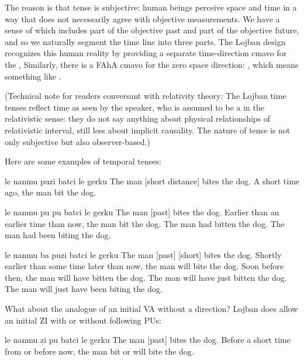The reason is that tense is subjective: human beings
    perceive space and time in a way that does not necessarily
    agree with objective measurements. We have a sense of 
    which includes part of the objective past and part of the
    objective future, and so we naturally segment the time line
    into three parts. The Lojban design recognizes this human
    reality by providing a separate time-direction cmavo for the
    , Similarly, there is a FAhA cmavo for the
    zero space direction: , which means something like
    .

(Technical note for readers conversant with relativity
    theory: The Lojban time tenses reflect time as seen by the
    speaker, who is assumed to be a  in the
    relativistic sense: they do not say anything about physical
    relationships of relativistic interval, still less about
    implicit causality. The nature of tense is not only subjective
    but also observer-based.)

Here are some examples of temporal tenses:
\begin{example}
le nanmu puzi batci le gerku\n
The man  [short distance] bites the dog.\n
A short time ago, the man bit the dog.
\end{example}

\begin{example}
le nanmu pu pu batci le gerku\n
The man  [past] bites the dog.\n
Earlier than an earlier time than now,\n
\T	the man bit the dog.\n
The man had bitten the dog.\n
The man had been biting the dog.
\end{example}

\begin{example}
le nanmu ba puzi batci le gerku\n
The man  [past] [short] bites the dog.\n
Shortly earlier than some time later than now,\n
\T	the man will bite the dog.\n
Soon before then, the man will have bitten the dog.\n
The man will have just bitten the dog.\n
The man will just have been biting the dog.
\end{example}

What about the analogue of an initial VA without a direction?
    Lojban does allow an initial ZI with or without following PUs:
\begin{example}
le nanmu zi pu batci le gerku\n
The man  [past] bites the dog.\n
Before a short time from or before now,\n
\T	the man bit or will bite the dog.
\end{example}

